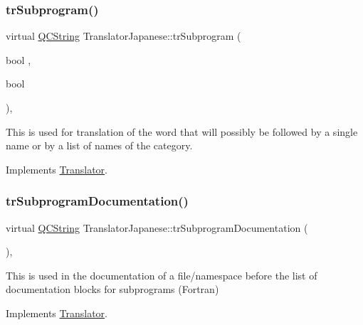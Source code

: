 \mbox{\label{class_translator_japanese_a8af1dd8d9b0ee2f95eb53bd7996b3580}} 
\subsubsection{\texorpdfstring{trSubprogram()}{trSubprogram()}}
{\footnotesize\ttfamily virtual \mbox{\hyperlink{class_q_c_string}{Q\+C\+String}} Translator\+Japanese\+::tr\+Subprogram (\begin{DoxyParamCaption}\item[{bool}]{,  }\item[{bool}]{ }\end{DoxyParamCaption})\hspace{0.3cm}{\ttfamily [inline]}, {\ttfamily [virtual]}}

This is used for translation of the word that will possibly be followed by a single name or by a list of names of the category. 

Implements \mbox{\hyperlink{class_translator}{Translator}}.

\mbox{\label{class_translator_japanese_afe1749201f814a91249daed400e03888}} 
\subsubsection{\texorpdfstring{trSubprogramDocumentation()}{trSubprogramDocumentation()}}
{\footnotesize\ttfamily virtual \mbox{\hyperlink{class_q_c_string}{Q\+C\+String}} Translator\+Japanese\+::tr\+Subprogram\+Documentation (\begin{DoxyParamCaption}{ }\end{DoxyParamCaption})\hspace{0.3cm}{\ttfamily [inline]}, {\ttfamily [virtual]}}

This is used in the documentation of a file/namespace before the list of documentation blocks for subprograms (Fortran) 

Implements \mbox{\hyperlink{class_translator}{Translator}}.

\mbox{\label{class_translator_japanese_acd8b5b61925f4d04424f10111f94daae}} 
